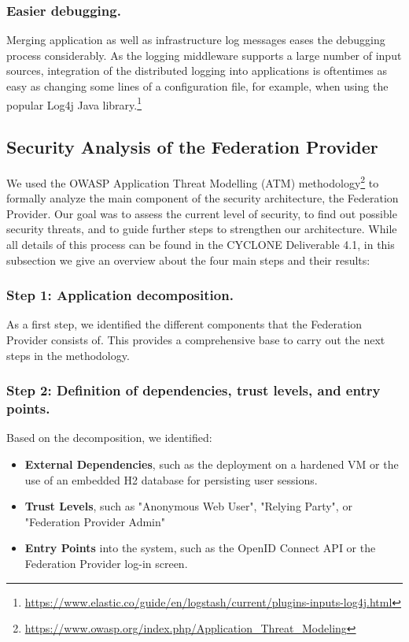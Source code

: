 \documentclass{llncs}
\begin{document}
\subsubsection{Easier debugging.} Merging application as well as infrastructure log messages eases the debugging process considerably. As the logging middleware supports a large number of input sources, integration of the distributed logging into applications is oftentimes as easy as changing some lines of a configuration file, for example, when using the popular Log4j Java library.\footnote{\url{https://www.elastic.co/guide/en/logstash/current/plugins-inputs-log4j.html}}

\subsection{Security Analysis of the Federation Provider}

We used the OWASP Application Threat Modelling (ATM) methodology\footnote{\url{https://www.owasp.org/index.php/Application\_Threat\_Modeling}} to formally analyze the main component of the security architecture, the Federation Provider. Our goal was to assess the current level of security, to find out possible security threats, and to guide further steps to strengthen our architecture. While all details of this process can be found in the CYCLONE Deliverable 4.1, in this subsection we give an overview about the four main steps and their results:

\subsubsection{Step 1: Application decomposition.}

As a first step, we identified the different components that the Federation Provider consists of. This provides a comprehensive base to carry out the next steps in the methodology.

\subsubsection{Step 2: Definition of dependencies, trust levels, and entry points.}

Based on the decomposition, we identified:

\begin{itemize}
	\item \textbf{External Dependencies}, such as the deployment on a hardened VM or the use of an embedded H2 database for persisting user sessions.
	\item \textbf{Trust Levels}, such as "Anonymous Web User", "Relying Party", or "Federation Provider Admin"
	\item \textbf{Entry Points} into the system, such as the OpenID Connect API or the Federation Provider log-in screen.
\end{itemize}
	
\end{document}
